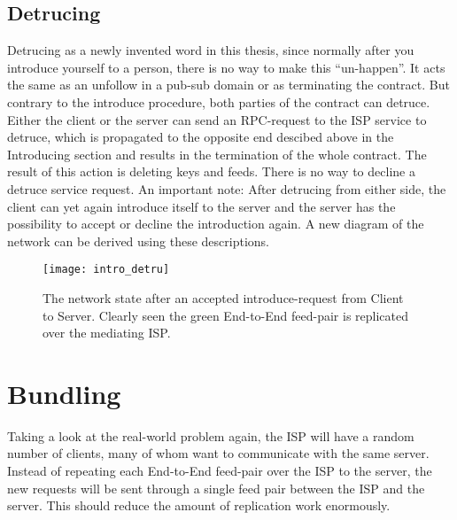 \subsection{Detrucing}
Detrucing as a newly invented word in this thesis, since normally after you introduce yourself to a person, there is no way to make this “un-happen”. It acts the same as an unfollow in a pub-sub domain or as terminating the contract. But contrary to the introduce procedure, both parties of the contract can detruce.
Either the client or the server can send an RPC-request to the ISP service to detruce, which is propagated to the opposite end descibed above in the Introducing section and results in the termination of the whole contract. The result of this action is deleting keys and feeds. There is no way to decline a detruce service request. An important note: After detrucing from either side, the client can yet again introduce itself to the server and the server has the possibility to accept or decline the introduction again.
A new diagram of the network can be derived using these descriptions.
\begin{figure}
    \centering
    \texttt{[image: intro\_detru]}
    \caption{The network state after an accepted introduce-request from Client to Server. Clearly seen the green End-to-End feed-pair is replicated over the mediating ISP.}
    \label{fig:contract_cli_isp}
\end{figure}

\pagebreak

\section{Bundling}
Taking a look at the real-world problem again, the ISP will have a random number of clients, many of whom want to communicate with the same server. Instead of repeating each End-to-End feed-pair over the ISP to the server, the new requests will be sent through a single feed pair between the ISP and the server. This should reduce the amount of replication work enormously.


